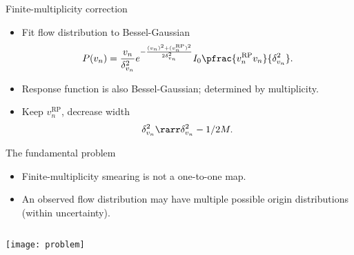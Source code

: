 \documentclass{beamer}
\begin{document}
\begin{frame}{Finite-multiplicity correction}
  \vspace{1em}

  \begin{itemize}
    \item Fit flow distribution to Bessel-Gaussian
      \begin{equation*}
        P(v_n) = \frac{v_n}{\delta_{v_n}^2} e^{ -\frac{(v_n)^2 + (v_n^\text{RP})^2}{2\delta_{v_n}^2} }
          I_0 \pfrac{v_n^\text{RP}v_n}{\delta_{v_n}^2}.
      \end{equation*}
    \item Response function is also Bessel-Gaussian; determined by multiplicity.
    \item Keep $v_n^\text{RP}$, decrease width
      \begin{equation*}
        \delta_{v_n}^2 \rarr \delta_{v_n}^2 - 1/2M.
      \end{equation*}
  \end{itemize}
\end{frame}


\begin{frame}{The fundamental problem}
  \begin{itemize}
    \item Finite-multiplicity smearing is not a one-to-one map.
    \item An observed flow distribution may have multiple possible origin distributions (within uncertainty).
  \end{itemize}
  \begin{columns}
    \vspace{1em}
    \texttt{[image: problem]}
    \hspace{-3em}
  \end{columns}
\end{frame}
\end{document}
